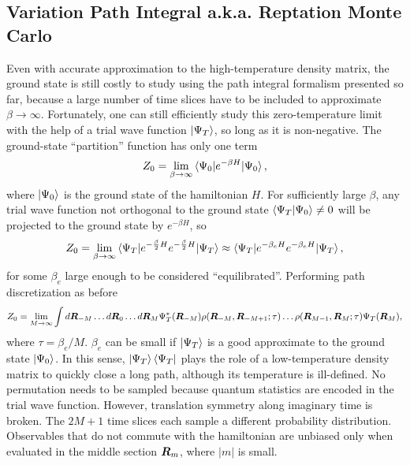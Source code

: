 \subsection{Variation Path Integral a.k.a. Reptation Monte Carlo}
Even with accurate approximation to the high-temperature density matrix, the ground state is still costly to study using the path integral formalism presented so far, because a large number of time slices have to be included to approximate $\beta\rightarrow\infty$. Fortunately, one can still efficiently study this zero-temperature limit with the help of a trial wave function $\ket{\Psi_T}$, so long as it is non-negative. The ground-state ``partition'' function has only one term
\begin{align}
Z_0 = \lim\limits_{\beta\rightarrow\infty} \braket{\Psi_0|e^{-\beta H}|\Psi_0},
\end{align}
where $\ket{\Psi_0}$ is the ground state of the hamiltonian $H$.
For sufficiently large $\beta$, any trial wave function not orthogonal to the ground state $\braket{\Psi_T|\Psi_0}\neq0$ will be projected to the ground state by $e^{-\beta H}$, so
\begin{align} \label{eq:rmc-z0}
Z_0 = \lim\limits_{\beta\rightarrow\infty}\braket{\Psi_T|e^{-\frac{\beta}{2} H}e^{-\frac{\beta}{2} H}|\Psi_T} \approx \braket{\Psi_T|e^{-\beta_e H}e^{-\beta_e H}|\Psi_T},
\end{align}
for some $\beta_e$ large enough to be considered ``equilibrated''. Performing path discretization as before
\begin{align} \label{eq:pimc-vpi-z0}
Z_0 = \lim\limits_{M\rightarrow\infty} \int d\boldsymbol{R}_{-M}\dots d\boldsymbol{R}_0\dots d\boldsymbol{R}_{M}
\Psi_T^*(\boldsymbol{R}_{-M})\rho(\boldsymbol{R}_{-M},\boldsymbol{R}_{-M+1};\tau)\dots\rho(\boldsymbol{R}_{M-1},\boldsymbol{R}_M;\tau)\Psi_T(\boldsymbol{R}_M),
\end{align}
where $\tau=\beta_e/M$. $\beta_e$ can be small if $\ket{\Psi_T}$ is a good approximate to the ground state $\ket{\Psi_0}$. In this sense, $\ket{\Psi_T}\bra{\Psi_T}$ plays the role of a low-temperature density matrix to quickly close a long path, although its temperature is ill-defined.
No permutation needs to be sampled because quantum statistics are encoded in the trial wave function.
However, translation symmetry along imaginary time is broken. The $2M+1$ time slices each sample a different probability distribution.
Observables that do not commute with the hamiltonian are unbiased only when evaluated in the middle section $\boldsymbol{R}_m$, where $\vert m\vert$ is small.
